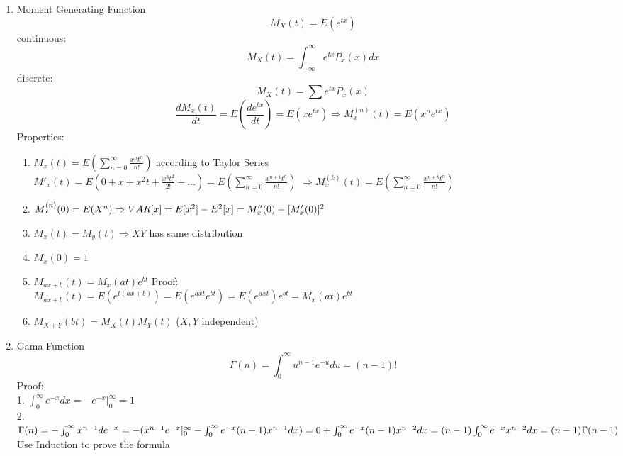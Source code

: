 \documentclass[10pt]{article}
\begin{document}
  
	\begin{multicols}{2}
		\begin{enumerate}
			\item Moment Generating Function\\
			$$M_X(t) = E(e^{tx})$$
			continuous: $$M_X(t) = \int_{-\infty}^{\infty}e^{tx}P_x(x)dx$$
			discrete: $$M_X(t) = \sum e^{tx}P_x(x)$$
			$$\frac{dM_x(t)}{dt} = E(\frac{de^{tx}}{dt}) = E(xe^{tx})\Rightarrow M^{(n)}_x(t) = E(x^ne^{tx})$$
			Properties:
			\begin{enumerate}
				\item $M_x(t) = E(\sum_{n=0}^{\infty}\frac{x^nt^n}{n!})$ according to Taylor Series\\
				$M'_x(t) = E(0+x+x^2t + \frac{x^3t^2}{2!} + \dots) = E(\sum_{n=0}^{\infty}\frac{x^{n+1}t^n}{n!})$
				$\Rightarrow M^{(k)}_x(t) = E(\sum_{n=0}^{\infty}\frac{x^{n+k}t^n}{n!})$
				\item $M_x^{(n)}(0) = E(X^n) \\ \Rightarrow VAR[x]=E[x^2] - E^2[x] = M_x''(0) - [M_x'(0)]^2 $
				\item $M_x(t) = M_y(t) \Rightarrow X Y$ has same distribution
				\item $M_x(0) = 1$
				\item $M_{ax + b}(t) = M_x(at)e^{bt}$   Proof:\\ $M_{ax+b}(t) = E(e^{t(ax+b)}) = E(e^{axt}e^{bt}) = E(e^{axt})e^{bt} = M_x(at)e^{bt}$
				\item $M_{X+Y}(bt) = M_X(t)M_Y(t)$ ($X,Y$ independent)
			\end{enumerate}
		
			\item Gama Function\\
			$$\Gamma(n) = \int_{0}^{\infty}u^{n-1}e^{-u}du = (n-1)!$$
			Proof:\\
			1. $\int_{0}^{\infty}e^{-x}dx = -e^{-x}|_0^{\infty} = 1$\\
			2. $\Gamma(n) = -\int_{0}^{\infty}x^{n-1}de^{-x}\\
			= - (x^{n-1}e^{-x}|_0^{\infty} - \int_{0}^{\infty}e^{-x}(n-1)x^{n-1}dx)\\
			= 0 + \int_{0}^{\infty}e^{-x}(n-1)x^{n-2}dx\\
			= (n-1)\int_{0}^{\infty}e^{-x}x^{n-2}dx\\
			= (n-1)\Gamma(n-1)$\\
			Use Induction to prove the formula
			

\end{enumerate}
\end{multicols}
\end{document}
